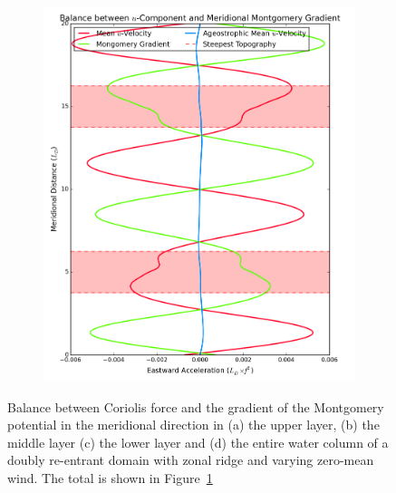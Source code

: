 \documentclass[12pt,a4paper]{report}
\newcommand*\figref[1]{Figure~\ref{#1}}
\begin{document}
\begin{figure}
\begin{subfigure}{0.48\linewidth}
 		\includegraphics[width=\linewidth ]{vgeo_4}
 		\label{fig:vgeototal}
 	\end{subfigure}
 	\caption{Balance between Coriolis force and the gradient
 		of the Montgomery potential in the meridional 
 		direction in (a) the upper layer, (b) the middle layer
 		(c) the lower layer and (d) the entire water column of 
 		a doubly re-entrant domain with 
 		zonal ridge and varying zero-mean wind. The total is shown in
 		\figref{fig:vgeototal}}
 	\label{fig:vgeo}
 \end{figure}
 
\end{document}
